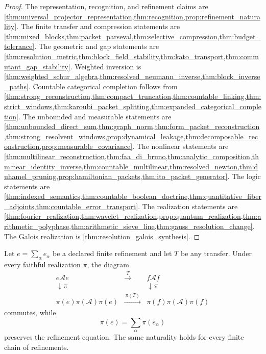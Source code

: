 \documentclass{aomart}
\theoremstyle{definition}
\theoremstyle{remark}
\newcommand{\Acal}{\mathcal A}
\begin{document}
\begin{proof}
The representation, recognition, and refinement claims are \cref{thm:universal_projector_representation,thm:recognition,prop:refinement_naturality}. The finite transfer and compression statements are \cref{thm:mixed_blocks,thm:packet_parseval,thm:selective_compression,thm:budget_tolerance}. The geometric and gap statements are \cref{thm:resolution_metric,thm:block_field_stability,thm:kato_transport,thm:commutant_gap_stability}. Weighted inversion is \cref{thm:weighted_schur_algebra,thm:resolved_neumann_inverse,thm:block_inverse_paths}. Countable categorical completion follows from \cref{thm:strong_reconstruction,thm:compact_truncation,thm:countable_linking,thm:strict_windows,thm:karoubi_packet_splitting,thm:expanded_categorical_completion}. The unbounded and measurable statements are \cref{thm:unbounded_direct_sum,thm:graph_norm,thm:form_packet_reconstruction,thm:strong_resolvent_windows,prop:dynamical_leakage,thm:decomposable_reconstruction,prop:measurable_covariance}. The nonlinear statements are \cref{thm:multilinear_reconstruction,thm:faa_di_bruno,thm:analytic_composition,thm:near_identity_inverse,thm:countable_multilinear,thm:resolved_newton,thm:duhamel_pruning,prop:hamiltonian_packets,thm:ito_packet_generator}. The logic statements are \cref{thm:indexed_semantics,thm:countable_boolean_doctrine,thm:quantitative_fiber_adjoints,thm:countable_error_transport}. The realization statements are \cref{thm:fourier_realization,thm:wavelet_realization,prop:quantum_realization,thm:arithmetic_polyphase,thm:arithmetic_sieve_line,thm:gauss_resolution_change}. The Galois realization is \cref{thm:resolution_galois_synthesis}.
\end{proof}

\begin{corollary}\label{cor:commuting_diagram}
Let \(e=\sum_\alpha e_\alpha\) be a declared finite refinement and let \(T\) be any transfer. Under every faithful realization \(\pi\), the diagram
\[
 \begin{array}{ccc}
 e\Acal e&\xrightarrow{\ T\ }&f\Acal f\\
 \downarrow\pi&&\downarrow\pi\\
 \pi(e)\pi(\Acal)\pi(e)&\xrightarrow{\ \pi(T)\ }&\pi(f)\pi(\Acal)\pi(f)
 \end{array}
\]
commutes, while
\[
 \pi(e)=\sum_\alpha\pi(e_\alpha)
\]
preserves the refinement equation. The same naturality holds for every finite chain of refinements.
\end{corollary}
\end{document}
